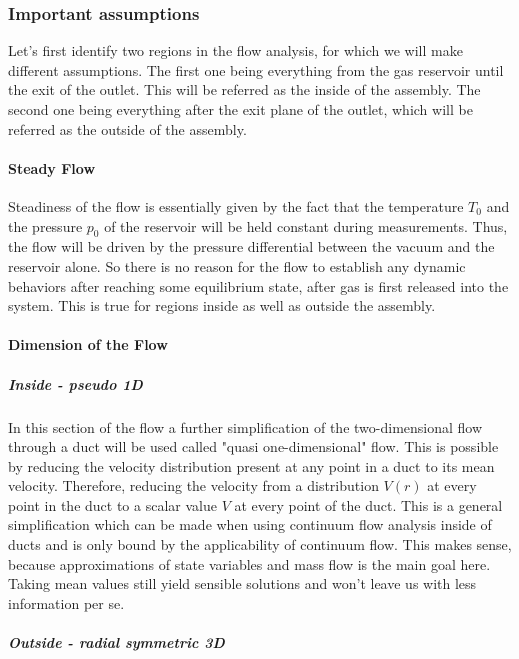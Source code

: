 \subsubsection{Important assumptions}

	Let's first identify two regions in the flow analysis, for which we will make different assumptions.
	The first one being everything from the gas reservoir until the exit of the outlet.
	This will be referred as the inside of the assembly.
	The second one being everything after the exit plane of the outlet, which will be referred as the outside of the assembly.

\paragraph{Steady Flow}

	Steadiness of the flow is essentially given by the fact that the temperature $T_0$ and the pressure $p_0$ of the reservoir will be held constant during measurements.
	Thus, the flow will be driven by the pressure differential between the vacuum and the reservoir alone.
	So there is no reason for the flow to establish any dynamic behaviors after reaching some equilibrium state, after gas is first released into the system.
	This is true for regions inside as well as outside the assembly.

\paragraph{Dimension of the Flow}

	\subparagraph{Inside - pseudo 1D}

		In this section of the flow a further simplification of the two-dimensional flow through a duct will be used called "quasi one-dimensional" flow.
		This is possible by reducing the velocity distribution present at any point in a duct to its mean velocity.
		Therefore, reducing the velocity from a distribution $V(r)$ at every point in the duct to a scalar value $V$ at every point of the duct.
		This is a general simplification which can be made when using continuum flow analysis inside of ducts and is only bound by the applicability of continuum flow.
		This makes sense, because approximations of state variables and mass flow is the main goal here.
		Taking mean values still yield sensible solutions and won't leave us with less information per se.

	\subparagraph{Outside - radial symmetric 3D}

